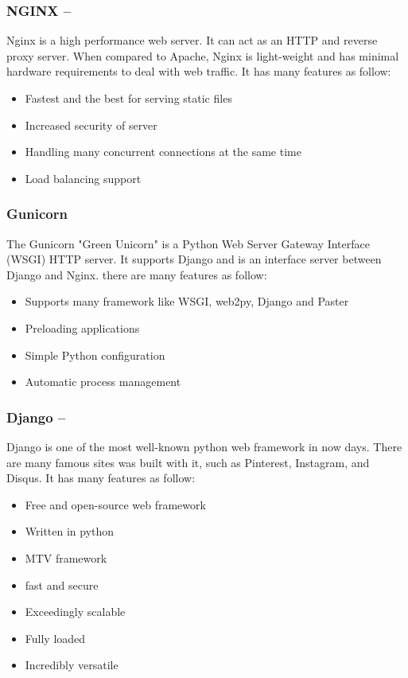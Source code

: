 \subsubsection*{NGINX  --  }

Nginx is a high performance web server. It can act as an HTTP and reverse proxy server. When compared to Apache, Nginx is light-weight and has minimal hardware requirements to deal with web traffic. It has many features as follow:
\begin{itemize}
	\item Fastest and the best for serving static files
	\item Increased security of server
	\item Handling many concurrent connections at the same time
	\item Load balancing support
\end{itemize}

\subsubsection*{Gunicorn}
The Gunicorn "Green Unicorn" is a Python Web Server Gateway Interface (WSGI) HTTP server. It supports Django and is an interface server between Django and Nginx.
there are many features as follow:
\begin{itemize}
	\item Supports many framework like WSGI, web2py, Django and Paster
	\item Preloading applications
	\item Simple Python configuration
	\item Automatic process management
\end{itemize}
\subsubsection*{Django  --  }
Django is one of the most well-known python web framework in now days. There are many famous sites was built with it, such as Pinterest, Instagram, and Disqus. 
It has many features as follow:
\begin{itemize}
	\item Free and open-source web framework
	\item Written in python
	\item MTV framework
	\item fast and secure
	\item Exceedingly scalable
	\item Fully loaded
	\item Incredibly versatile
\end{itemize}

